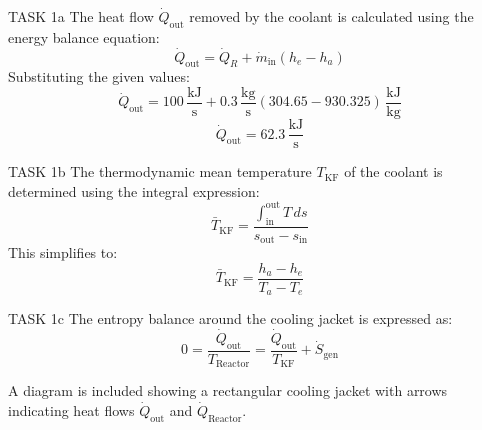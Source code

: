 TASK 1a  
The heat flow \( \dot{Q}_{\text{out}} \) removed by the coolant is calculated using the energy balance equation:  
\[
\dot{Q}_{\text{out}} = \dot{Q}_R + \dot{m}_{\text{in}} \left( h_e - h_a \right)
\]  
Substituting the given values:  
\[
\dot{Q}_{\text{out}} = 100 \, \frac{\text{kJ}}{\text{s}} + 0.3 \, \frac{\text{kg}}{\text{s}} \left( 304.65 - 930.325 \right) \, \frac{\text{kJ}}{\text{kg}}
\]  
\[
\dot{Q}_{\text{out}} = 62.3 \, \frac{\text{kJ}}{\text{s}}
\]  

TASK 1b  
The thermodynamic mean temperature \( T_{\text{KF}} \) of the coolant is determined using the integral expression:  
\[
\bar{T}_{\text{KF}} = \frac{\int_{\text{in}}^{\text{out}} T \, ds}{s_{\text{out}} - s_{\text{in}}}
\]  
This simplifies to:  
\[
\bar{T}_{\text{KF}} = \frac{h_a - h_e}{T_a - T_e}
\]  

TASK 1c  
The entropy balance around the cooling jacket is expressed as:  
\[
0 = \frac{\dot{Q}_{\text{out}}}{T_{\text{Reactor}}} = \frac{\dot{Q}_{\text{out}}}{T_{\text{KF}}} + \dot{S}_{\text{gen}}
\]  

A diagram is included showing a rectangular cooling jacket with arrows indicating heat flows \( \dot{Q}_{\text{out}} \) and \( \dot{Q}_{\text{Reactor}} \).